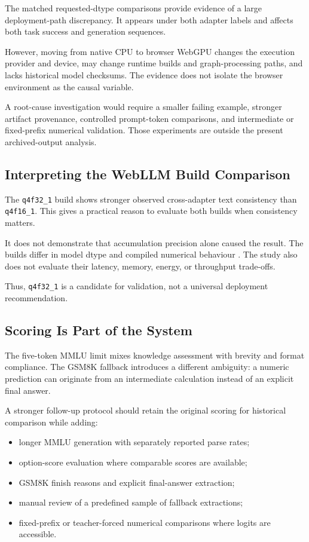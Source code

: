 \documentclass[conference]{IEEEtran}
\newcommand{\mlchalf}{\texttt{q4f16\_1}}
\newcommand{\mlcfull}{\texttt{q4f32\_1}}
\begin{document}
The matched requested-dtype comparisons provide evidence
of a large deployment-path discrepancy.
It appears under both adapter labels and affects both task
success and generation sequences.

However, moving from native CPU to browser WebGPU changes
the execution provider and device, may change runtime builds
and graph-processing paths, and lacks historical model
checksums.
The evidence does not isolate the browser environment as
the causal variable.

A root-cause investigation would require a smaller failing
example, stronger artifact provenance, controlled
prompt-token comparisons, and intermediate or fixed-prefix
numerical validation.
Those experiments are outside the present archived-output
analysis.


\subsection{Interpreting the WebLLM Build Comparison}

The \mlcfull{} build shows stronger observed cross-adapter
text consistency than \mlchalf{}.
This gives a practical reason to evaluate both builds when
consistency matters.

It does not demonstrate that accumulation precision alone
caused the result.
The builds differ in model dtype and compiled numerical
behaviour \cite{mlc}.
The study also does not evaluate their latency, memory,
energy, or throughput trade-offs.

Thus, \mlcfull{} is a candidate for validation, not a universal
deployment recommendation.


\subsection{Scoring Is Part of the System}

The five-token MMLU limit mixes knowledge assessment with
brevity and format compliance.
The GSM8K fallback introduces a different ambiguity:
a numeric prediction can originate from an intermediate
calculation instead of an explicit final answer.

A stronger follow-up protocol should retain the original
scoring for historical comparison while adding:

\begin{itemize}
\item longer MMLU generation with separately reported
parse rates;

\item option-score evaluation where comparable scores
are available;

\item GSM8K finish reasons and explicit final-answer
extraction;

\item manual review of a predefined sample of fallback
extractions;

\item fixed-prefix or teacher-forced numerical comparisons
where logits are accessible.
\end{itemize}
\end{document}
